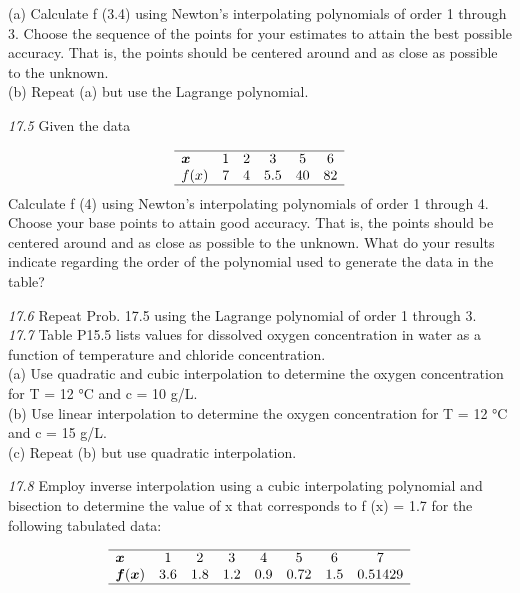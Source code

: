 \documentclass[../main.tex]{subfiles}
\begin{document}
\begin{multicols}{2}
(a) Calculate f (3.4) using Newton's interpolating polynomials of order 1 through 3. Choose the sequence of the points
for your estimates to attain the best possible accuracy.
That is, the points should be centered around and as close
as possible to the unknown.\\
(b) Repeat (a) but use the Lagrange polynomial.

\noindent\textit{17.5} Given the data

$$
\begin{array}{lccccc}
\hline \boldsymbol{x} & 1 & 2 & 3 & 5 & 6 \\
f(x) & 7 & 4 & 5.5 & 40 & 82 \\
\hline
\end{array}
$$
Calculate f (4) using Newton's interpolating polynomials of
order 1 through 4. Choose your base points to attain good
accuracy. That is, the points should be centered around and
as close as possible to the unknown. What do your results
indicate regarding the order of the polynomial used to generate the data in the table?

\noindent\textit{17.6}
Repeat Prob. 17.5 using the Lagrange polynomial of
order 1 through 3.\\
\noindent\textit{17.7}
Table P15.5 lists values for dissolved oxygen concentration in water as a function of temperature and chloride
concentration.\\
(a) Use quadratic and cubic interpolation to determine the
oxygen concentration for T = 12 °C and c = 10 g/L.\\
(b) Use linear interpolation to determine the oxygen concentration for T = 12 °C and c = 15 g/L.\\
(c) Repeat (b) but use quadratic interpolation.

\noindent\textit{17.8} Employ inverse interpolation using a cubic interpolating polynomial and bisection to determine the value of x that
corresponds to f (x) = 1.7 for the following tabulated data:

$$
\begin{array}{lccccccc}
\hline \boldsymbol{x} & 1 & 2 & 3 & 4 & 5 & 6 & 7 \\
\boldsymbol{f}(\boldsymbol{x}) & 3.6 & 1.8 & 1.2 & 0.9 & 0.72 & 1.5 & 0.51429 \\
\hline
\end{array}
$$


\end{multicols}
\end{document}
